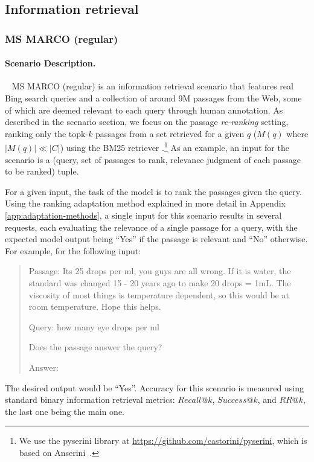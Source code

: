 \subsection{Information retrieval}
\label{app:scenarios-IR}

\subsubsection{MS MARCO (regular)}
\paragraph{Scenario Description.}
\msmarcoregular~\citep{nguyen2016ms} MS MARCO (regular) is an information retrieval scenario that features real Bing search queries and a collection of around 9M passages from the Web, some of which are deemed relevant to each query through human annotation.
As described in the scenario section, we focus on the passage \textit{re-ranking} setting, ranking only the topk-$k$ passages from a set retrieved for a given $q$ (\ie $M(q)$ where $|M(q)| \ll |C|$) using the BM25 retriever \citep{robertson2009probabilistic}.\footnote{We use the pyserini library at \url{https://github.com/castorini/pyserini}, which is based on Anserini~\citep{yang2017anserini}.}
As an example, an input for the scenario is a (query, set of passages to rank, relevance judgment of each passage to be ranked) tuple.

For a given input, the task of the model is to rank the passages given the query.
Using the ranking adaptation method explained in more detail in Appendix \ref{app:adaptation-methods}, a single input for this scenario results in several requests, each evaluating the relevance of a single passage for a query, with the expected model output being ``Yes'' if the passage is relevant and ``No'' otherwise. For example, for the following input:

\begin{quote}
    Passage: Its 25 drops per ml, you guys are all wrong. If it is water, the standard was changed 15 - 20 years ago to make 20 drops = 1mL. The viscosity of most things is temperature dependent, so this would be at room temperature. Hope this helps.
    
    Query: how many eye drops per ml
            
    Does the passage answer the query?
    
    Answer:
\end{quote}

The desired output would be ``Yes''. Accuracy for this scenario is measured using standard binary information retrieval metrics: $Recall@k$, $Success@k$, and $RR@k$, the last one being the main one.

